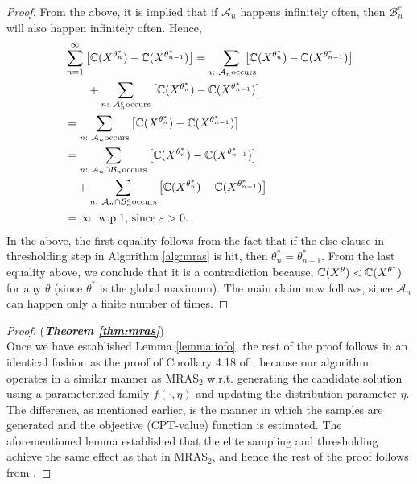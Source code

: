 \begin{proof}
From the above, it is implied that if $\mathcal{A}_n$ happens infinitely often,
then $\mathcal{B}_n^c$ will also happen infinitely often. Hence,
\begin{align*}
&\sum_{n=1}^{\infty}\big[\C(X^{\theta^*_n})-\C(X^{\theta^*_{n-1}})\big] 
=\!\sum_{n:~\mathcal{A}_n \text{occurs}}\!\!\!\!\!\!\!\big[\C(X^{\theta^*_n})-\C(X^{\theta^*_{n-1}})\big]\\
&\qquad+\sum_{n:~\mathcal{A}_n^c \text{occurs}}\big[\C(X^{\theta^*_n})-\C(X^{\theta^*_{n-1}})\big] \\ 
&=\sum_{n:~\mathcal{A}_n \text{occurs}}\big[\C(X^{\theta^*_n})-\C(X^{\theta^*_{n-1}})\big]\\ 
&=\sum_{n:~\mathcal{A}_n\cap \mathcal{B}_n \text{occurs}}\big[\C(X^{\theta^*_n})-\C(X^{\theta^*_{n-1}})\big]\\
&\quad +\sum_{n:~\mathcal{A}_n\cap \mathcal{B}_n^c \text{occurs}}\big[\C(X^{\theta^*_n})-\C(X^{\theta^*_{n-1}})\big] \\ 
&=\infty \text{~~w.p.1, since $\varepsilon>0$.}
\end{align*}
In the above, the first equality follows from the fact that if the else clause in thresholding step in Algorithm \ref{alg:mras} is hit, then $\theta^*_{n} = \theta^*_{n-1}$.
%
From the last equality above, we conclude that it is a contradiction because, $\mathbb{C}(X^{\theta}) < \mathbb{C}(X^{\theta^*})$ for any $\theta$ (since $\theta^*$ is the global maximum). The main claim now follows, since $\mathcal{A}_n$ can happen only a finite number of times.
\end{proof}

\begin{proof}(\textbf{\textit{Theorem \ref{thm:mras}}})\ \\
Once we have established Lemma \ref{lemma:iofo}, the rest of the proof follows in an identical fashion as the proof of Corollary 4.18 of \cite{chang2013simulation}, because our algorithm operates in a similar manner as MRAS$_2$ w.r.t. generating the candidate solution using a parameterized family $f(\cdot, \eta)$ and updating the distribution parameter $\eta$. The difference, as mentioned earlier, is the manner in which the samples are generated and the objective (CPT-value) function is estimated. The aforementioned lemma established that the elite sampling and thresholding achieve the same effect as that in MRAS$_2$, and hence the rest of the proof follows from \cite{chang2013simulation}.
\end{proof}
